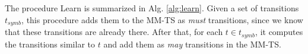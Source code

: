 The procedure Learn is summarized in Alg. \ref{alg:learn}.
Given a set of transitions $t_{symb}$, this procedure adds them to the MM-TS as \emph{must} transitions, since we know that these transitions are already there. After that, for each $t\in t_{symb}$, it computes the transitions similar to $t$ and add them as \emph{may} transitions in the MM-TS.







